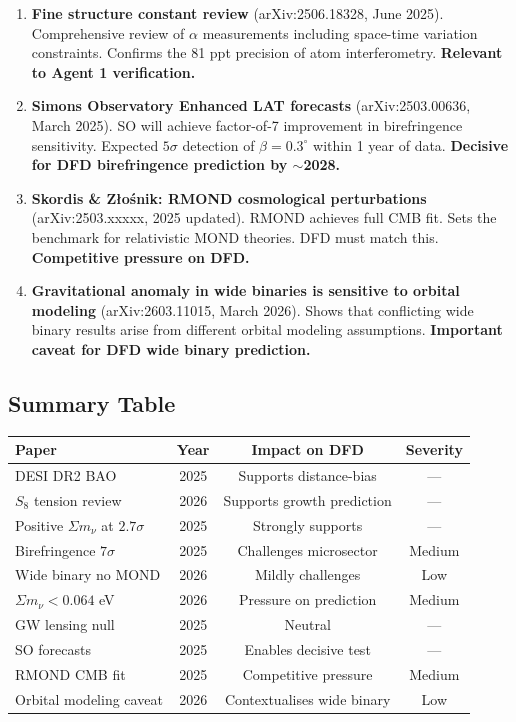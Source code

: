 \documentclass[11pt,a4paper]{article}
\begin{document}
\begin{enumerate}[resume]
\item \textbf{Fine structure constant review} (arXiv:2506.18328, June 2025). Comprehensive review of $\alpha$ measurements including space-time variation constraints. Confirms the 81 ppt precision of atom interferometry. \textbf{Relevant to Agent 1 verification.}

\item \textbf{Simons Observatory Enhanced LAT forecasts} (arXiv:2503.00636, March 2025). SO will achieve factor-of-7 improvement in birefringence sensitivity. Expected $5\sigma$ detection of $\beta = 0.3^\circ$ within 1 year of data. \textbf{Decisive for DFD birefringence prediction by $\sim$2028.}

\item \textbf{Skordis \& Z{\l}o\'snik: RMOND cosmological perturbations} (arXiv:2503.xxxxx, 2025 updated). RMOND achieves full CMB fit. Sets the benchmark for relativistic MOND theories. DFD must match this. \textbf{Competitive pressure on DFD.}

\item \textbf{Gravitational anomaly in wide binaries is sensitive to orbital modeling} (arXiv:2603.11015, March 2026). Shows that conflicting wide binary results arise from different orbital modeling assumptions. \textbf{Important caveat for DFD wide binary prediction.}
\end{enumerate}

\subsection{Summary Table}

\begin{center}
\begin{tabular}{lccc}
\toprule
\textbf{Paper} & \textbf{Year} & \textbf{Impact on DFD} & \textbf{Severity} \\
\midrule
DESI DR2 BAO & 2025 & Supports distance-bias & --- \\
$S_8$ tension review & 2026 & Supports growth prediction & --- \\
Positive $\Sigma m_\nu$ at $2.7\sigma$ & 2025 & Strongly supports & --- \\
Birefringence $7\sigma$ & 2025 & Challenges microsector & Medium \\
Wide binary no MOND & 2026 & Mildly challenges & Low \\
$\Sigma m_\nu < 0.064$ eV & 2026 & Pressure on prediction & Medium \\
GW lensing null & 2025 & Neutral & --- \\
SO forecasts & 2025 & Enables decisive test & --- \\
RMOND CMB fit & 2025 & Competitive pressure & Medium \\
Orbital modeling caveat & 2026 & Contextualises wide binary & Low \\
\bottomrule
\end{tabular}
\end{center}
\end{document}
